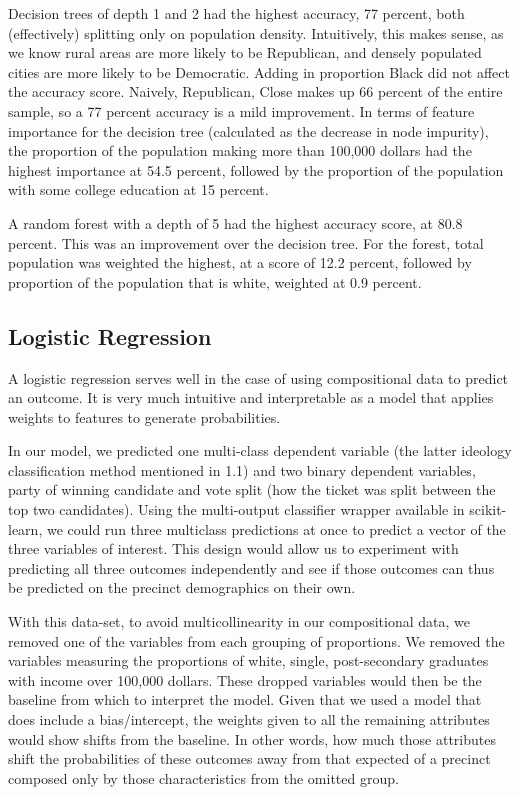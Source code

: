 \documentclass{article}
\begin{document}
Decision trees of depth 1 and 2 had the highest accuracy, 77 percent, both (effectively) splitting only on population density. Intuitively, this makes sense, as we know rural areas are more likely to be Republican, and densely populated cities are more likely to be Democratic. Adding in proportion Black did not affect the accuracy score. Naively, Republican, Close makes up 66 percent of the entire sample, so a 77 percent accuracy is a mild improvement. In terms of feature importance for the decision tree (calculated as the decrease in node impurity), the proportion of the population making more than 100,000 dollars had the highest importance at 54.5 percent, followed by the proportion of the population with some college education at 15 percent.

A random forest with a depth of 5 had the highest accuracy score, at 80.8 percent. This was an improvement over the decision tree. For the forest, total population was weighted the highest, at a score of 12.2 percent, followed by proportion of the population that is white, weighted at 0.9 percent.

\subsection{Logistic Regression}

A logistic regression serves well in the case of using compositional data to predict an outcome. It is very much intuitive and interpretable as a model that applies weights to features to generate probabilities.

In our model, we predicted one multi-class dependent variable (the latter ideology classification method mentioned in 1.1) and two binary dependent variables, party of winning candidate and vote split (how the ticket was split between the top two candidates). Using the multi-output classifier wrapper available in scikit-learn, we could run three multiclass predictions at once to predict a vector of the three variables of interest. This design would allow us to experiment with predicting all three outcomes independently and see if those outcomes can thus be predicted on the precinct demographics on their own. 

With this data-set, to avoid multicollinearity in our compositional data, we removed one of the variables from each grouping of proportions. We removed the variables measuring the proportions of white, single, post-secondary graduates with income over 100,000 dollars. These dropped variables would then be the baseline from which to interpret the model. Given that we used a model that does include a bias/intercept, the weights given to all the remaining attributes would show shifts from the baseline. In other words, how much those attributes shift the probabilities of these outcomes away from that expected of a precinct composed only by those characteristics from the omitted group.
\end{document}
